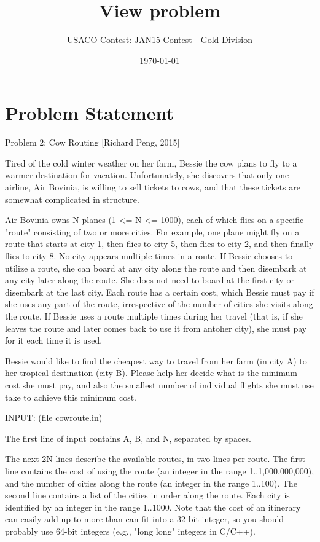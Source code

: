 \documentclass[12pt]{article}
\title{View problem}
\author{USACO Contest: JAN15 Contest - Gold Division}
\date{\today}
\begin{document}
\maketitle

\section*{Problem Statement}

Problem 2: Cow Routing [Richard Peng, 2015]

Tired of the cold winter weather on her farm, Bessie the cow plans to
fly to a warmer destination for vacation.  Unfortunately, she
discovers that only one airline, Air Bovinia, is willing to sell
tickets to cows, and that these tickets are somewhat complicated in
structure.

Air Bovinia owns N planes (1 <= N <= 1000), each of which flies on a
specific "route" consisting of two or more cities.  For example, one
plane might fly on a route that starts at city 1, then flies to city
5, then flies to city 2, and then finally flies to city 8.  No city
appears multiple times in a route.  If Bessie chooses to utilize a
route, she can board at any city along the route and then disembark at
any city later along the route.  She does not need to board at the
first city or disembark at the last city.  Each route has a certain
cost, which Bessie must pay if she uses any part of the route,
irrespective of the number of cities she visits along the route.  If
Bessie uses a route multiple times during her travel (that is, if she
leaves the route and later comes back to use it from antoher city),
she must pay for it each time it is used.

Bessie would like to find the cheapest way to travel from her farm
(in city A) to her tropical destination (city B). Please help her
decide what is the minimum cost she must pay, and also the smallest
number of individual flights she must use take to achieve this minimum
cost.

INPUT: (file cowroute.in)

The first line of input contains A, B, and N, separated by spaces.  

The next 2N lines describe the available routes, in two lines per
route. The first line contains the cost of using the route (an integer
in the range 1..1,000,000,000), and the number of cities along the
route (an integer in the range 1..100).  The second line contains a
list of the cities in order along the route.  Each city is identified
by an integer in the range 1..1000.  Note that the cost of an
itinerary can easily add up to more than can fit into a 32-bit
integer, so you should probably use 64-bit integers (e.g., "long long"
integers in C/C++).
\end{document}
